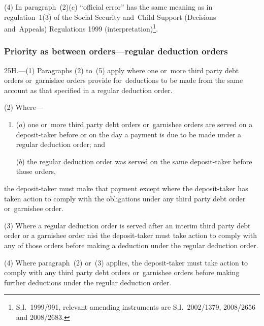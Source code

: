 \documentclass[12pt,a4paper]{article}
\begin{document}
(4) In paragraph~(2)($e$)  “official error” has the same meaning as in regulation~1(3) of the Social Security and~Child Support (Decisions and~Appeals) Regulations 1999 (interpretation)\footnote{S.I.~1999/991, relevant amending instruments are S.I.~2002/1379, 2008/2656 and 2008/2683.}.


\subsubsection[25H. Priority as between orders---regular deduction orders]{Priority as between orders---regular deduction orders}

25H.---(1)  Paragraphs (2) to~(5) apply where one or~more third party debt orders or~garnishee orders provide for~deductions to be made from the same account as that specified in a regular deduction order.

(2) Where—
\begin{enumerate}\item[]
($a$) one or~more third party debt orders or~garnishee orders are served on a deposit-taker before or on the day a payment is due to be made under a regular deduction order; and

($b$) the regular deduction order was served on the same deposit-taker before those orders,
\end{enumerate}
the deposit-taker must make that payment except where the deposit-taker has taken action to comply with the obligations under any third party debt order or~garnishee order.

(3) Where a regular deduction order is served after an interim third party debt order or a garnishee order nisi the deposit-taker must take action to comply with any of those orders before making a deduction under the regular deduction order.

(4) Where paragraph~(2) or~(3) applies, the deposit-taker must take action to comply with any third party debt orders or~garnishee orders before making further deductions under the regular deduction order.
\end{document}
